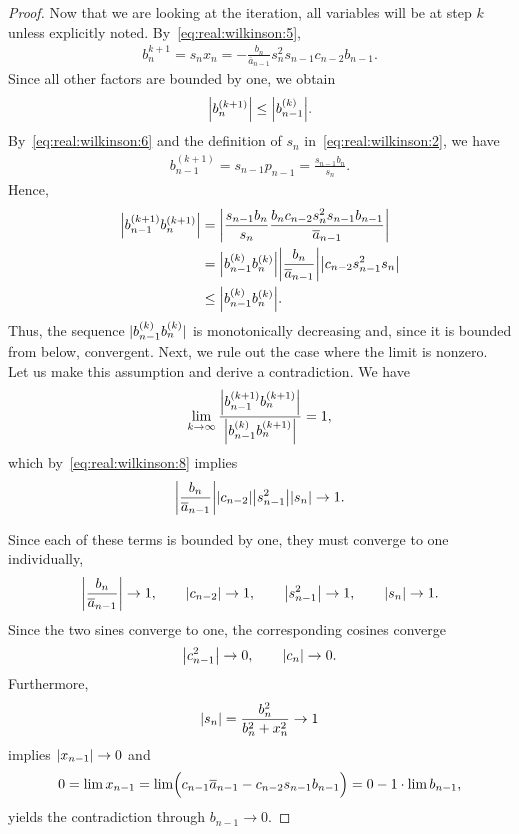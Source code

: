\begin{proof}
Now that we are looking at the iteration, all variables will be at
step $k$ unless explicitly noted. By~\eqref{eq:real:wilkinson:5},
\begin{gather}
  b_n^{k+1} = s_n x_n
  = - \frac{b_n}{\overline a_{n-1}} s_n^2 s_{n-1} c_{n-2} b_{n-1}.
\end{gather}
Since all other factors are bounded by one, we obtain
\begin{gather}
  \label{eq:real:wilkinson:7}
  \abs*{b_n^{(k+1)}} \le \abs*{b_{n-1}^{(k)}}.
\end{gather}
By~\eqref{eq:real:wilkinson:6} and the definition of $s_{n}$
in~\eqref{eq:real:wilkinson:2}, we have
\begin{gather}
  b_{n-1}^{(k+1)} = s_{n-1} p_{n-1} = \frac{s_{n-1}b_n}{s_n}.
\end{gather}
Hence,
\begin{align}
  \abs*{b_{n-1}^{(k+1)}b_{n}^{(k+1)}}
  &= \abs*{\frac{s_{n-1}b_{n}}{s_n}
    \frac{b_nc_{n-2}s_n^2s_{n-1}b_{n-1}}{\overline a_{n-1}}}\\
  \label{eq:real:wilkinson:8}
  &= \abs*{b_{n-1}^{(k)}b_{n}^{(k)}}\abs*{\frac{b_n}{\overline a_{n-1}}}
    \abs*{c_{n-2}s_{n-1}^2s_n}\\
  \label{eq:real:wilkinson:9}
    &\le \abs*{b_{n-1}^{(k)}b_{n}^{(k)}}.
\end{align}
Thus, the sequence $\abs{b_{n-1}^{(k)}b_{n}^{(k)}}$ is monotonically
decreasing and, since it is bounded from below, convergent.
Next, we rule out the case where the limit is nonzero. Let
us make this assumption and derive a contradiction. We have
\begin{gather}
  \lim_{k\to\infty}
  \frac{\abs*{b_{n-1}^{(k+1)}b_{n}^{(k+1)}}}%
  {\abs*{b_{n-1}^{(k)}b_{n}^{(k+1)}}}
  = 1,
\end{gather}
which by~\eqref{eq:real:wilkinson:8} implies
\begin{gather}
  \abs*{\frac{b_n}{\overline a_{n-1}}}
  \abs*{c_{n-2}}\abs*{s_{n-1}^2}\abs*{s_n} \to 1.
\end{gather}

Since each of these terms is bounded by one, they must converge to one
individually,
\begin{gather}
  \abs*{\frac{b_n}{\overline a_{n-1}}} \to 1,\qquad
  \abs*{c_{n-2}} \to 1,\qquad
  \abs*{s_{n-1}^2} \to 1,\qquad
  \abs*{s_n} \to 1.
\end{gather}
Since the two sines converge to one, the corresponding cosines converge
\begin{gather}
  \abs*{c_{n-1}^2} \to 0,\qquad \abs*{c_n} \to 0.
\end{gather}
Furthermore,
\begin{gather}
  \abs*{s_n} = \frac{b_n^2}{b_n^2+x_n^2} \to 1
\end{gather}
implies $\abs{x_{n-1}} \to 0$ and
\begin{gather}
  0 = \lim x_{n-1}
  = \lim \Bigl(c_{n-1}\overline a_{n-1} - c_{n-2}s_{n-1}b_{n-1}\Bigr)
  = 0 - 1\cdot \lim b_{n-1},
\end{gather}
yields the contradiction through $b_{n-1} \to 0$.


\end{proof}

